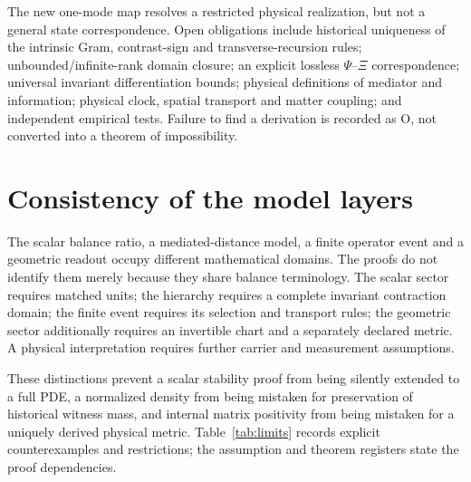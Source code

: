 \documentclass[11pt,letterpaper]{article}
\theoremstyle{definition}
\numberwithin{equation}{section}
\begin{document}
The new one-mode map resolves a restricted physical realization, but not a general state correspondence. Open obligations include historical uniqueness of the intrinsic Gram, contrast-sign and transverse-recursion rules; unbounded/infinite-rank domain closure; an explicit lossless $\Psi$--$\Xi$ correspondence; universal invariant differentiation bounds; physical definitions of mediator and information; physical clock, spatial transport and matter coupling; and independent empirical tests. Failure to find a derivation is recorded as O, not converted into a theorem of impossibility.

\section{Consistency of the model layers}
The scalar balance ratio, a mediated-distance model, a finite operator event and a geometric readout occupy different mathematical domains. The proofs do not identify them merely because they share balance terminology. The scalar sector requires matched units; the hierarchy requires a complete invariant contraction domain; the finite event requires its selection and transport rules; the geometric sector additionally requires an invertible chart and a separately declared metric. A physical interpretation requires further carrier and measurement assumptions.

These distinctions prevent a scalar stability proof from being silently extended to a full PDE, a normalized density from being mistaken for preservation of historical witness mass, and internal matrix positivity from being mistaken for a uniquely derived physical metric. Table~\ref{tab:limits} records explicit counterexamples and restrictions; the assumption and theorem registers state the proof dependencies.

\clearpage
\end{document}
